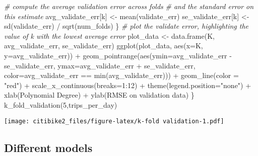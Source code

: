 \documentclass[
]{article}
\newenvironment{Shaded}{\begin{snugshade}}{\end{snugshade}}
\newcommand{\AttributeTok}[1]{\textcolor[rgb]{0.77,0.63,0.00}{#1}}
\newcommand{\CommentTok}[1]{\textcolor[rgb]{0.56,0.35,0.01}{\textit{#1}}}
\newcommand{\DecValTok}[1]{\textcolor[rgb]{0.00,0.00,0.81}{#1}}
\newcommand{\FunctionTok}[1]{\textcolor[rgb]{0.00,0.00,0.00}{#1}}
\newcommand{\NormalTok}[1]{#1}
\newcommand{\OtherTok}[1]{\textcolor[rgb]{0.56,0.35,0.01}{#1}}
\newcommand{\SpecialCharTok}[1]{\textcolor[rgb]{0.00,0.00,0.00}{#1}}
\newcommand{\StringTok}[1]{\textcolor[rgb]{0.31,0.60,0.02}{#1}}
\begin{document}
\begin{Shaded}
\begin{Highlighting}[]
    \CommentTok{\# compute the average validation error across folds}
    \CommentTok{\# and the standard error on this estimate}
\NormalTok{    avg\_validate\_err[k] }\OtherTok{\textless{}{-}} \FunctionTok{mean}\NormalTok{(validate\_err)}
\NormalTok{    se\_validate\_err[k] }\OtherTok{\textless{}{-}} \FunctionTok{sd}\NormalTok{(validate\_err) }\SpecialCharTok{/} \FunctionTok{sqrt}\NormalTok{(num\_folds)}
\NormalTok{  \}}
  \CommentTok{\# plot the validate error, highlighting the value of k with the lowest average error}
\NormalTok{  plot\_data }\OtherTok{\textless{}{-}} \FunctionTok{data.frame}\NormalTok{(K, avg\_validate\_err, se\_validate\_err)}
  \FunctionTok{ggplot}\NormalTok{(plot\_data, }\FunctionTok{aes}\NormalTok{(}\AttributeTok{x=}\NormalTok{K, }\AttributeTok{y=}\NormalTok{avg\_validate\_err)) }\SpecialCharTok{+}
    \FunctionTok{geom\_pointrange}\NormalTok{(}\FunctionTok{aes}\NormalTok{(}\AttributeTok{ymin=}\NormalTok{avg\_validate\_err }\SpecialCharTok{{-}}\NormalTok{ se\_validate\_err,}
                        \AttributeTok{ymax=}\NormalTok{avg\_validate\_err }\SpecialCharTok{+}\NormalTok{ se\_validate\_err,}
                        \AttributeTok{color=}\NormalTok{avg\_validate\_err }\SpecialCharTok{==} \FunctionTok{min}\NormalTok{(avg\_validate\_err))) }\SpecialCharTok{+}
    \FunctionTok{geom\_line}\NormalTok{(}\AttributeTok{color =} \StringTok{"red"}\NormalTok{) }\SpecialCharTok{+}
    \FunctionTok{scale\_x\_continuous}\NormalTok{(}\AttributeTok{breaks=}\DecValTok{1}\SpecialCharTok{:}\DecValTok{12}\NormalTok{) }\SpecialCharTok{+}
    \FunctionTok{theme}\NormalTok{(}\AttributeTok{legend.position=}\StringTok{"none"}\NormalTok{) }\SpecialCharTok{+}
    \FunctionTok{xlab}\NormalTok{(}\StringTok{\textquotesingle{}Polynomial Degree\textquotesingle{}}\NormalTok{) }\SpecialCharTok{+}
    \FunctionTok{ylab}\NormalTok{(}\StringTok{\textquotesingle{}RMSE on validation data\textquotesingle{}}\NormalTok{)}
\NormalTok{\}}
\FunctionTok{k\_fold\_validation}\NormalTok{(}\DecValTok{5}\NormalTok{,trips\_per\_day)}
\end{Highlighting}
\end{Shaded}

\texttt{[image: citibike2\_files/figure-latex/k-fold validation-1.pdf]}

\hypertarget{different-models}{%
\subsection{Different models}\label{different-models}}
\end{document}
